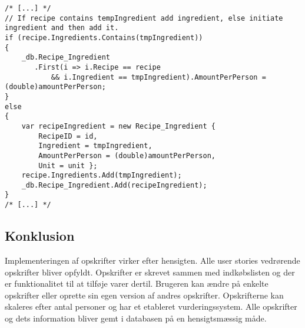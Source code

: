 \begin{lstlisting}[caption="Udklip fra \class{AddIngredient} som opretter og tilføjer ingredienser til en specifik opskrift - Her er vist hvad der er forskel fra \class{AddItem} i \class{ShoppingListsController}"]
/* [...] */      
// If recipe contains tempIngredient add ingredient, else initiate ingredient and then add it.
if (recipe.Ingredients.Contains(tmpIngredient))
{
    _db.Recipe_Ingredient
       .First(i => i.Recipe == recipe 
       	   && i.Ingredient == tmpIngredient).AmountPerPerson = (double)amountPerPerson;
}
else
{
    var recipeIngredient = new Recipe_Ingredient { 
    	RecipeID = id, 
    	Ingredient = tmpIngredient, 
    	AmountPerPerson = (double)amountPerPerson, 
    	Unit = unit };
    recipe.Ingredients.Add(tmpIngredient);
    _db.Recipe_Ingredient.Add(recipeIngredient);
}
/* [...] */          
\end{lstlisting}


\subsection{Konklusion}
Implementeringen af opskrifter virker efter hensigten. 
Alle user stories vedrørende opskrifter bliver opfyldt. 
Opskrifter er skrevet sammen med indkøbslisten og der er funktionalitet til at tilføje varer dertil. 
Brugeren kan ændre på enkelte opskrifter eller oprette sin egen version af andres opskrifter. 
Opskrifterne kan skaleres efter antal personer og har et etableret vurderingssystem. 
Alle opskrifter og dets information bliver gemt i databasen på en hensigtsmæssig måde.
